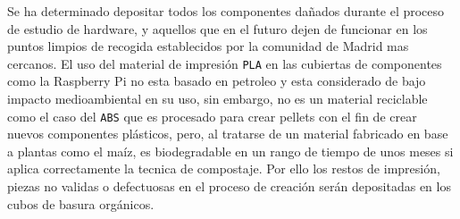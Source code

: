 Se ha determinado depositar todos los componentes dañados durante el proceso de estudio de hardware, y aquellos que en el futuro dejen de funcionar en los puntos limpios de recogida establecidos por la comunidad de Madrid mas cercanos. El uso del material de impresión \verb|PLA| en las cubiertas de componentes como la Raspberry Pi no esta basado en petroleo y esta considerado de bajo impacto medioambiental en su uso, sin embargo, no es un material reciclable como el caso del \verb|ABS| que es procesado para crear pellets con el fin de crear nuevos componentes plásticos, pero, al tratarse de un material fabricado en base a plantas como el maíz, es biodegradable en un rango de tiempo de unos meses si aplica correctamente la tecnica de compostaje. Por ello los restos de impresión, piezas no validas o defectuosas en el proceso de creación serán depositadas en los cubos de basura orgánicos.